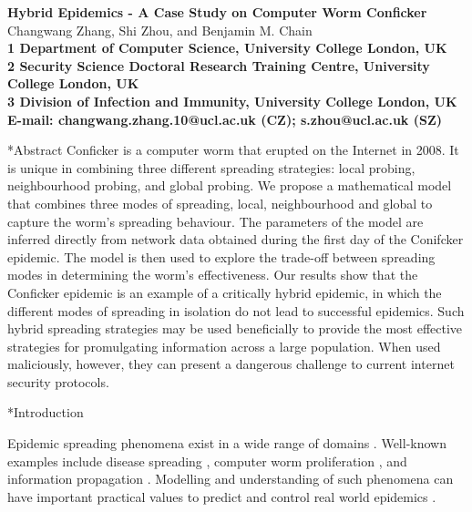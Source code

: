 \documentclass[9pt]{article}
\makeatletter
\renewcommand{\section}{\@startsection {section}{1}{0pt}{-6pt}{1pt}{\reset@font \large \bfseries}}
\makeatother
\begin{document}
\begin{flushleft}
	{\Large
		\textbf{Hybrid Epidemics - A Case Study on Computer Worm Conficker}
	}
    \newline
\\
	Changwang Zhang, 
	Shi Zhou,
    and Benjamin M. Chain
	\\
    \bigskip
	\bf{1} Department of Computer Science, University College London, UK
	\\
	\bf{2} Security Science Doctoral Research Training Centre, University College London, UK
	\\
	\bf{3} Division of Infection and Immunity, University College London, UK
	\\
    \bigskip
	 E-mail: changwang.zhang.10@ucl.ac.uk (CZ); s.zhou@ucl.ac.uk (SZ)
\end{flushleft}

\section*{Abstract} Conficker is a computer worm that erupted on the Internet in 2008. It is unique in combining three different spreading strategies: local probing, neighbourhood probing, and global probing. We propose a mathematical model that combines three modes of spreading, local, neighbourhood and global to capture the worm's spreading behaviour. The parameters of the model are inferred directly from network data obtained during the first day of the Conifcker epidemic. The model is then used to explore the trade-off between spreading modes in determining the worm's effectiveness. Our results show that the Conficker epidemic is an example of a critically hybrid epidemic, in which the different modes of spreading in isolation do not lead to successful epidemics. Such hybrid spreading strategies may be used beneficially to provide the most effective strategies for promulgating information across a large population. When used maliciously, however, they can present a dangerous challenge to current internet security protocols. 

\section*{Introduction}

Epidemic spreading phenomena exist in a wide range of domains \cite{House_2012,Rock_2014}. Well-known examples include disease spreading \cite{R_Zheng_2014_3,R_Nie_2014,R_Li_2014}, computer worm proliferation \cite{Zou_2006,Shin_2012,Yu_2015}, and information propagation \cite{Ren_2014,Chen_2014,Sahneh_2014}. Modelling and understanding of such phenomena can have important practical values to predict and control real world epidemics \cite{R_Zheng_2014_3,R_Nie_2014,R_Li_2014,R_Zhang_2014_2,R_Zhang_2014,Moore_2003,Shannon_Moore_2004}.
\end{document}
